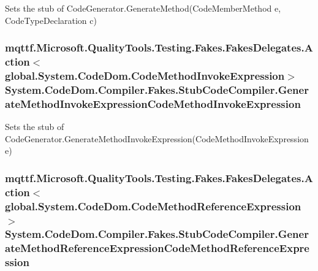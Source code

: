 Sets the stub of Code\-Generator.\-Generate\-Method(\-Code\-Member\-Method e, Code\-Type\-Declaration c)

\hypertarget{class_system_1_1_code_dom_1_1_compiler_1_1_fakes_1_1_stub_code_compiler_a74cc3bd8f077b944398f4c947461575e}{
\subsubsection[{Generate\-Method\-Invoke\-Expression\-Code\-Method\-Invoke\-Expression}]{\setlength{\rightskip}{0pt plus 5cm}mqttf.\-Microsoft.\-Quality\-Tools.\-Testing.\-Fakes.\-Fakes\-Delegates.\-Action$<$global.\-System.\-Code\-Dom.\-Code\-Method\-Invoke\-Expression$>$ System.\-Code\-Dom.\-Compiler.\-Fakes.\-Stub\-Code\-Compiler.\-Generate\-Method\-Invoke\-Expression\-Code\-Method\-Invoke\-Expression}}\label{class_system_1_1_code_dom_1_1_compiler_1_1_fakes_1_1_stub_code_compiler_a74cc3bd8f077b944398f4c947461575e}


Sets the stub of Code\-Generator.\-Generate\-Method\-Invoke\-Expression(\-Code\-Method\-Invoke\-Expression e)

\hypertarget{class_system_1_1_code_dom_1_1_compiler_1_1_fakes_1_1_stub_code_compiler_a8233dfdb683b34fc33c5d1a4e0f50031}{
\subsubsection[{Generate\-Method\-Reference\-Expression\-Code\-Method\-Reference\-Expression}]{\setlength{\rightskip}{0pt plus 5cm}mqttf.\-Microsoft.\-Quality\-Tools.\-Testing.\-Fakes.\-Fakes\-Delegates.\-Action$<$global.\-System.\-Code\-Dom.\-Code\-Method\-Reference\-Expression$>$ System.\-Code\-Dom.\-Compiler.\-Fakes.\-Stub\-Code\-Compiler.\-Generate\-Method\-Reference\-Expression\-Code\-Method\-Reference\-Expression}}\label{class_system_1_1_code_dom_1_1_compiler_1_1_fakes_1_1_stub_code_compiler_a8233dfdb683b34fc33c5d1a4e0f50031}


